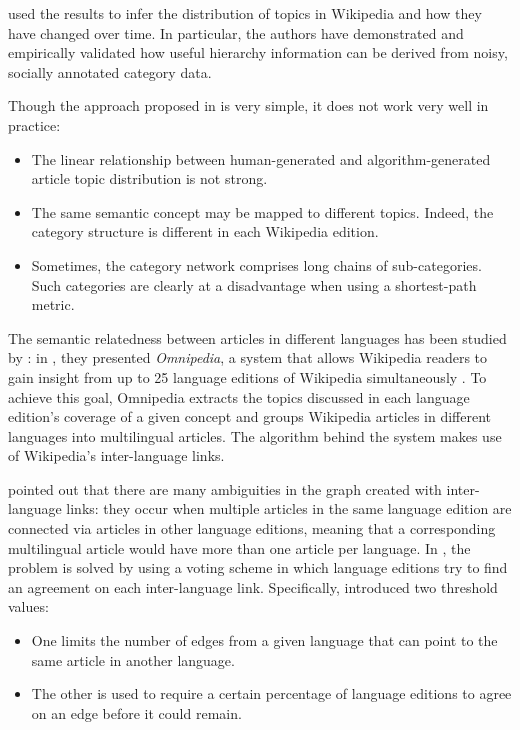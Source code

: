         \citeauthor{Kittur} used the results to infer the distribution of topics in Wikipedia and how they have changed over time. In particular, the authors have demonstrated and empirically validated how useful hierarchy information can be derived from noisy, socially annotated category data.
        
        Though the approach proposed in \cite{Kittur} is very simple, it does not work very well in practice:
        \begin{itemize}
            \item The linear relationship between human-generated and algorithm-generated article topic distribution is not strong.
            \item The same semantic concept may be mapped to different topics. Indeed, the category structure is different in each Wikipedia edition.
            \item Sometimes, the category network comprises long chains of sub-categories. Such categories are clearly at a disadvantage when using a shortest-path metric.
        \end{itemize}
        
        The semantic relatedness between articles in different languages has been studied by \citeauthor{Bao}: in \citeyear{Bao}, they presented \emph{Omnipedia}, a system that allows Wikipedia readers to gain insight from up to 25 language editions of Wikipedia simultaneously \cite{Bao}. To achieve this goal, Omnipedia extracts the topics discussed in each language edition's coverage of a given concept and groups Wikipedia articles in different languages into multilingual articles. The algorithm behind the system makes use of Wikipedia's inter-language links.
        
        \citeauthor{Bao} pointed out that there are many ambiguities in the graph created with inter-language links: they occur when multiple articles in the same language edition are connected via articles in other language editions, meaning that a corresponding multilingual article would have more than one article per language. In \cite{Bao}, the problem is solved by using a voting scheme in which language editions try to find an agreement on each inter-language link. Specifically, \citeauthor{Bao} introduced two threshold values:
        \begin{itemize}
            \item One limits the number of edges from a given language that can point to the same article in another language.
            \item The other is used to require a certain percentage of language editions to agree on an edge before it could remain.
        \end{itemize}
        
